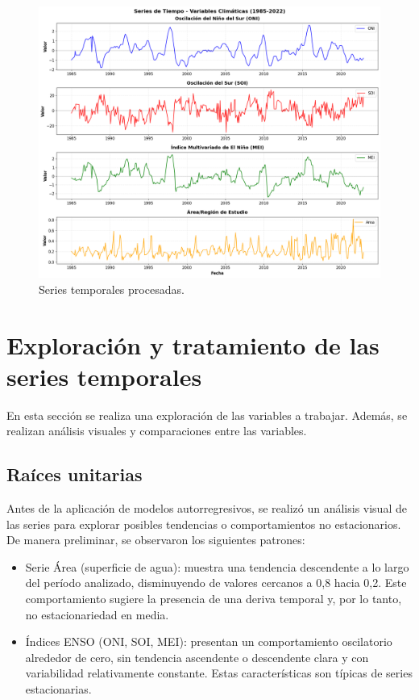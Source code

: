 \begin{figure}[ht]
        \centering
        \includegraphics[scale=.32]
        {Figures/ts_final.png}
        \caption{Series temporales procesadas.}
        \label{fig:ts_final}
\end{figure}

\section{Exploración y tratamiento de las series temporales}
En esta sección se realiza una exploración de las variables a trabajar. Además, se realizan análisis visuales y comparaciones entre las variables. 

\subsection{Raíces unitarias}

Antes de la aplicación de modelos autorregresivos, se realizó un análisis visual de las 
series para explorar posibles tendencias o comportamientos no estacionarios. De manera 
preliminar, se observaron los siguientes patrones:

\begin{itemize}
    \item Serie Área (superficie de agua): muestra una tendencia descendente a lo 
    largo del período analizado, disminuyendo de valores cercanos a 0,8 hacia 0,2. Este 
    comportamiento sugiere la presencia de una deriva temporal y, por lo tanto, 
    no estacionariedad en media.
    \item Índices ENSO (ONI, SOI, MEI): presentan un comportamiento oscilatorio 
    alrededor de cero, sin tendencia ascendente o descendente clara y con variabilidad 
    relativamente constante. Estas características son típicas de series estacionarias.
\end{itemize}

